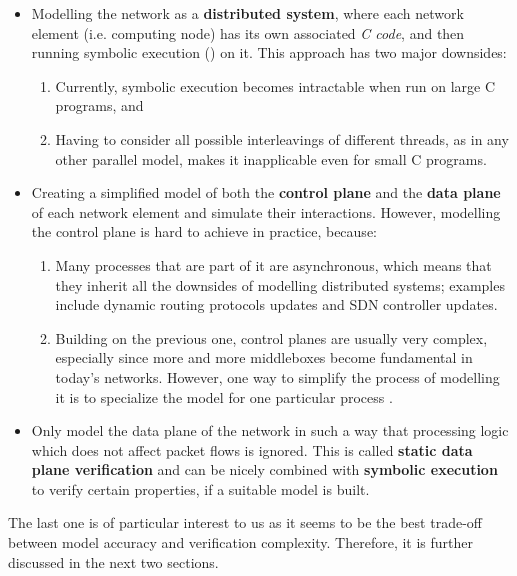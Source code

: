 \begin{itemize}
  \item Modelling the network as a \textbf{distributed system}, where each
    network element (i.e. computing node) has its own associated \emph{C
    code}, and then running symbolic execution
    () on it.  This approach has two
    major downsides:
      \begin{enumerate}[label=(\roman*)]
        \item Currently, symbolic execution becomes intractable when run on
          large C programs, and
        \item Having to consider all possible interleavings of different
          threads, as in any other parallel model, makes it inapplicable even
          for small C programs.
      \end{enumerate}
  \item Creating a simplified model of both the \textbf{control plane} and
    the \textbf{data plane} of each network element and simulate their
    interactions.  However, modelling the control plane is hard to achieve in
    practice, because:
    \begin{enumerate}[label=(\roman*)]
      \item Many processes that are part of it are asynchronous, which means
        that they inherit all the downsides of modelling distributed systems;
        examples include dynamic routing protocols updates and
        SDN controller updates.
      \item Building on the previous one, control planes are usually very
        complex, especially since more and more middleboxes become fundamental
        in today's networks.  However, one way to simplify the process of
        modelling it is to specialize the model for one particular process
        \cite{weitz2016bagpipe, fogel2015general}.
    \end{enumerate}
  \item Only model the data plane of the network in such a way that processing
    logic which does not affect packet flows is ignored.  This is called
    \textbf{static data plane verification} and can be nicely combined with
    \textbf{symbolic execution} to verify certain properties, if a suitable
    model is built.
\end{itemize}

The last one is of particular interest to us as it seems to be the best
trade-off between model accuracy and verification complexity.  Therefore, it is
further discussed in the next two sections.


